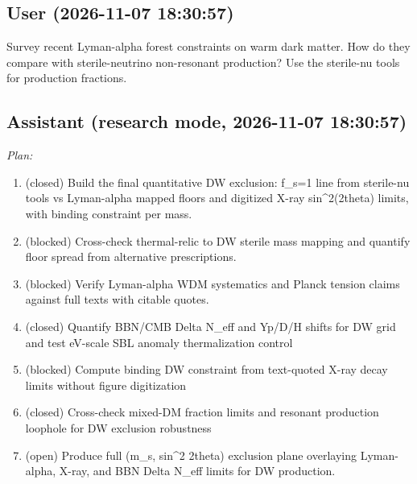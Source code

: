 \documentclass[11pt,a4paper]{article}
\begin{document}
\subsection*{User \small(2026-11-07 18:30:57)}
Survey recent Lyman-alpha forest constraints on warm dark matter. How do they compare with sterile-neutrino non-resonant production? Use the sterile-nu tools for production fractions.

\subsection*{Assistant \small(research mode, 2026-11-07 18:30:57)}
\textit{Plan:}\begin{enumerate}
  \item (closed) Build the final quantitative DW exclusion: f\_s=1 line from sterile-nu tools vs Lyman-alpha mapped floors and digitized X-ray sin\textasciicircum{}2(2theta) limits, with binding constraint per mass.
  \item (blocked) Cross-check thermal-relic to DW sterile mass mapping and quantify floor spread from alternative prescriptions.
  \item (blocked) Verify Lyman-alpha WDM systematics and Planck tension claims against full texts with citable quotes.
  \item (closed) Quantify BBN/CMB Delta N\_eff and Yp/D/H shifts for DW grid and test eV-scale SBL anomaly thermalization control
  \item (blocked) Compute binding DW constraint from text-quoted X-ray decay limits without figure digitization
  \item (closed) Cross-check mixed-DM fraction limits and resonant production loophole for DW exclusion robustness
  \item (open) Produce full (m\_s, sin\textasciicircum{}2 2theta) exclusion plane overlaying Lyman-alpha, X-ray, and BBN Delta N\_eff limits for DW production.
\end{enumerate}
\end{document}
